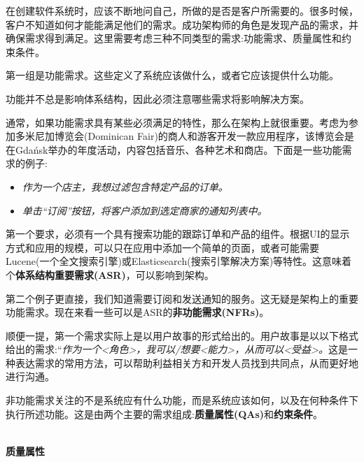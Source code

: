 
在创建软件系统时，应该不断地问自己，所做的是否是客户所需要的。很多时候，客户不知道如何才能能满足他们的需求。成功架构师的角色是发现产品的需求，并确保需求得到满足。这里需要考虑三种不同类型的需求:功能需求、质量属性和约束条件。


第一组是功能需求。这些定义了系统应该做什么，或者它应该提供什么功能。

\begin{tcolorbox}[colback=webgreen!5!white,colframe=webgreen!75!black, title=TIP]
\hspace*{0.7cm}功能并不总是影响体系结构，因此必须注意哪些需求将影响解决方案。
\end{tcolorbox}

通常，如果功能需求具有某些必须满足的特性，那么在架构上就很重要。考虑为参加多米尼加博览会(Dominican Fair)的商人和游客开发一款应用程序，该博览会是在Gdańsk举办的年度活动，内容包括音乐、各种艺术和商店。下面是一些功能需求的例子:

\begin{itemize}
\item 
\textit{作为一个店主，我想过滤包含特定产品的订单。}

\item 
\textit{单击“订阅”按钮，将客户添加到选定商家的通知列表中。}
\end{itemize}

第一个要求，必须有一个具有搜索功能的跟踪订单和产品的组件。根据UI的显示方式和应用的规模，可以只在应用中添加一个简单的页面，或者可能需要Lucene(一个全文搜索引擎)或Elasticsearch(搜索引擎解决方案)等特性。这意味着个\textbf{体系结构重要需求(ASR)}，可以影响到架构。

第二个例子更直接，我们知道需要订阅和发送通知的服务。这无疑是架构上的重要功能需求。现在来看一些可以是ASR的\textbf{非功能需求(NFRs)}。

顺便一提，第一个需求实际上是以用户故事的形式给出的。用户故事是以以下格式给出的需求:“\textit{作为一个<角色>，我可以/想要<能力>，从而可以<受益>。}这是一种表达需求的常用方法，可以帮助利益相关方和开发人员找到共同点，从而更好地进行沟通。


非功能需求关注的不是系统应有什么功能，而是系统应该如何，以及在何种条件下执行所述功能。这是由两个主要的需求组成:\textbf{质量属性(QAs)}和\textbf{约束条件}。

\hspace*{\fill} \\ %
\noindent
\textbf{质量属性}

